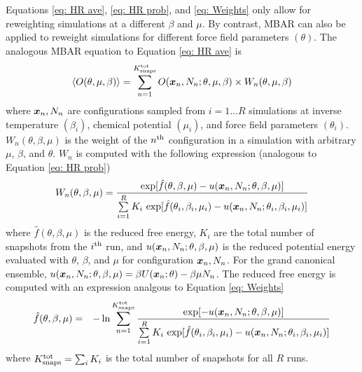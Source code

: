 \documentclass[journal=jced,manuscript=article]{achemso}
\newcommand{\bfv}[1]{{\mbox{\boldmath{$#1$}}}}
\newcommand{\x}{\bfv{x}}
\begin{document}
Equations \ref{eq: HR ave}, \ref{eq: HR prob}, and \ref{eq: Weights} only allow for reweighting simulations at a different $\beta$ and $\mu$. By contrast, MBAR can also be applied to reweight simulations for different force field parameters $(\theta)$. The analogous MBAR equation to Equation \ref{eq: HR ave} is
\begin{eqnarray} \label{eq: MBAR ave}
\langle O(\theta,\mu,\beta)\rangle = \sum_{n=1}^{K^{\rm tot}_{\rm snaps}} O(\x_{n},N_n;\theta,\mu,\beta) \times W_{n}(\theta,\mu,\beta)
\end{eqnarray}
where $\x_n,N_n$ are configurations sampled from $i=1 \ldots R$ simulations at inverse temperature $(\beta_{i})$, chemical potential $(\mu_{i})$, and force field parameters $(\theta_i)$. $W_{n}(\theta,\beta,\mu)$ is the weight of the $n^{\rm th}$ configuration in a simulation with arbitrary $\mu$, $\beta$, and $\theta$. $W_{n}$ is computed with the following expression (analogous to Equation \ref{eq: HR prob})
\begin{eqnarray} \label{eq: MBAR weights}
W_{n}(\theta,\beta,\mu) = \frac{\exp[\hat{f}(\theta,\beta,\mu)-u(\x_{n},N_n;\theta,\beta,\mu)]}{\sum\limits_{i=1}^R K_i \, \exp[\hat{f}(\theta_i,\beta_{i},\mu_{i}) - u(\x_{n},N_n;\theta_i,\beta_{i},\mu_{i})]}
\end{eqnarray}
where $\hat f(\theta,\beta,\mu)$ is the reduced free energy, $K_i$ are the total number of snapshots from the $i^{\rm th}$ run, and $u(\x_{n},N_n;\theta,\beta,\mu)$ is the reduced potential energy evaluated with $\theta$, $\beta$, and $\mu$ for configuration $\x_n,N_n$. For the grand canonical ensemble, $u(\x_{n},N_n;\theta,\beta,\mu) = \beta U(\x_n;\theta) - \beta \mu N_n$. The reduced free energy is computed with an expression analgous to Equation \ref{eq: Weights}
\begin{eqnarray} \label{eq: MBAR free energy}
\hat f(\theta,\beta,\mu) &=& - \ln \sum_{n=1}^{K^{\rm tot}_{\rm snaps}}
\frac{\exp[-u(\x_{n},N_n;\theta,\beta,\mu)]}{\sum\limits_{i=1}^R K_i \, \exp[\hat{f}(\theta_i,\beta_{i},\mu_{i}) - u(\x_{n},N_n;\theta_i,\beta_{i},\mu_{i})]}
\end{eqnarray}
where $K^{\rm tot}_{\rm snaps} = \sum_i K_i$ is the total number of snapshots for all $R$ runs.
\end{document}
